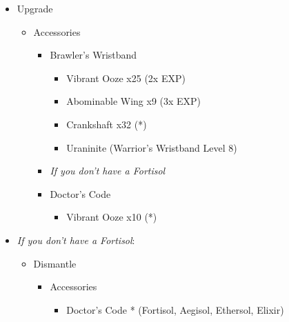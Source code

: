 \begin{upgrade}
\begin{multicols}{2}
\begin{itemize}
    \item Upgrade
    \begin{itemize}
        \item Accessories
        \begin{itemize}
            \item Brawler's Wristband
            \begin{itemize}
                \item Vibrant Ooze x25 (2x EXP)
                \item Abominable Wing x9 (3x EXP)
                \item Crankshaft x32 (*)
                \item Uraninite (Warrior's Wristband Level 8)
            \end{itemize}
            \item \textit{If you don't have a Fortisol}
            \item Doctor's Code
            \begin{itemize}
                \item Vibrant Ooze x10 (*)
            \end{itemize}
        \end{itemize}
    \end{itemize}
    \columnbreak
    \item \textit{If you don't have a Fortisol}:
    \begin{itemize}
        \item Dismantle
        \begin{itemize}
            \item Accessories
            \begin{itemize}
                \item Doctor's Code * (Fortisol, Aegisol, Ethersol, Elixir)
            \end{itemize}
        \end{itemize}
    \end{itemize}
\end{itemize}
\end{multicols}
\end{upgrade}
